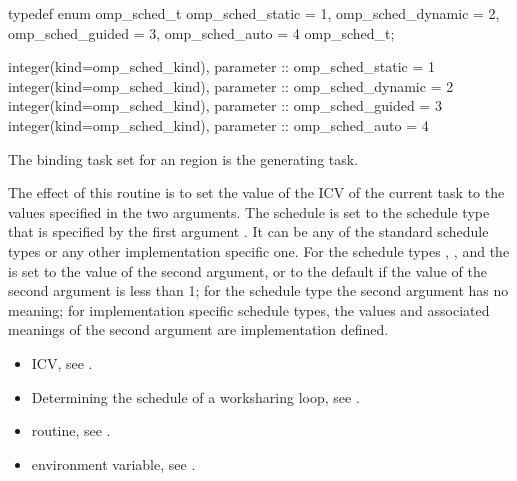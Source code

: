 \begin{ccppspecific}
\begin{ompcEnum}
typedef enum omp_sched_t {
  omp_sched_static = 1,
  omp_sched_dynamic = 2,
  omp_sched_guided = 3,
  omp_sched_auto = 4
} omp_sched_t;
\end{ompcEnum}
\end{ccppspecific}

\begin{samepage}
\begin{fortranspecific}
\begin{ompfEnum}
integer(kind=omp_sched_kind), parameter :: omp_sched_static = 1
integer(kind=omp_sched_kind), parameter :: omp_sched_dynamic = 2
integer(kind=omp_sched_kind), parameter :: omp_sched_guided = 3
integer(kind=omp_sched_kind), parameter :: omp_sched_auto = 4
\end{ompfEnum}
\end{fortranspecific}
\end{samepage}

\binding
The binding task set for an  region is the generating task.

\effect
The effect of this routine is to set the value of the  
ICV of the current task to the values specified in the two arguments. The 
schedule is set to the schedule type that is specified by the first argument 
. It can be any of the standard schedule types or any other implementation 
specific one. For the schedule types , , and
 the  is set to the value of the second 
argument, or to the default  if the value of the second 
argument is less than 1; for the schedule type  the second 
argument has no meaning; for implementation specific schedule types,
the values and associated meanings of the second argument are implementation defined.

\crossreferences
\begin{itemize}
\item {} ICV, see
.

\item Determining the schedule of a worksharing loop, see
.

\item {} routine, see
.

\item {} environment variable, see
.
\end{itemize}



